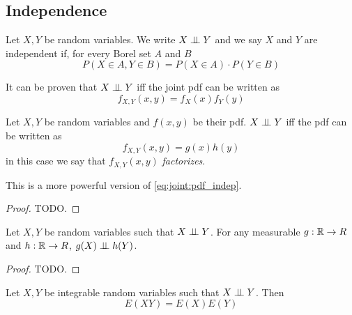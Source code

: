 \documentclass[12pt]{extarticle}
\begin{document}
\subsection{Independence}

\begin{definition}
    Let $X, Y$ be random variables.
    We write $X \perp \!\!\! \perp Y$ and we say $X$ and $Y$ are independent if, for every Borel set $A$ and $B$
    \begin{equation}
        P(X \in A, Y \in B) = P(X\in A) \cdot P(Y \in B)
    \end{equation}
\end{definition}

It can be proven that $X \perp \!\!\! \perp Y$ iff the joint pdf can be written as
\begin{equation}
    f_{X, Y} (x, y) = f_X(x)f_Y(y) \label{eq:joint:pdf_indep}
\end{equation}

\begin{theorem}
    Let $X, Y$ be random variables and $f(x,y)$ be their pdf.
    $X \perp \!\!\! \perp Y$ iff the pdf can be written as
    \begin{equation}
        f_{X, Y}(x, y) = g(x)h(y)
    \end{equation}
    in this case we say that $f_{X, Y} (x, y)$ \emph{factorizes}.

    This is a more powerful version of \autoref{eq:joint:pdf_indep}.
\end{theorem}

\begin{proof}
    TODO.
\end{proof}

\begin{theorem}
    \label{thm:joint:transformation_independent}

    Let $X, Y$ be random variables such that $X \perp \!\!\! \perp Y$.
    For any measurable $g: \mathbb{R} \to R$ and $h: \mathbb{R} \to R$, $g(X) \perp \!\!\! \perp h(Y)$.
\end{theorem}

\begin{proof}
    TODO.
\end{proof}

\begin{theorem}
    Let $X, Y$ be integrable random variables such that $X \perp \!\!\! \perp Y$. Then
    \begin{equation}
        E(XY) = E(X)E(Y)
    \end{equation}
\end{theorem}
\end{document}
